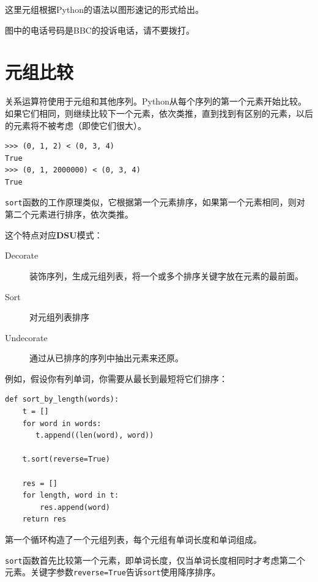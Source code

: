 这里元组根据Python的语法以图形速记的形式给出。

图中的电话号码是BBC的投诉电话，请不要拨打。



\section{元组比较}


关系运算符使用于元组和其他序列。Python从每个序列的第一个元素开始比较。如果它们相同，则继续比较下一个元素，依次类推，直到找到有区别的元素，以后的元素将不被考虑（即使它们很大）。

\beforeverb
\begin{verbatim}
>>> (0, 1, 2) < (0, 3, 4)
True
>>> (0, 1, 2000000) < (0, 3, 4)
True
\end{verbatim}
\afterverb
%
{\tt sort}函数的工作原理类似，它根据第一个元素排序，如果第一个元素相同，则对第二个元素进行排序，依次类推。

这个特点对应{\bf DSU}模式： 

\begin{description}

\item[Decorate] 装饰序列，生成元组列表，将一个或多个排序关键字放在元素的最前面。

\item[Sort] 对元组列表排序

\item[Undecorate] 通过从已排序的序列中抽出元素来还原。

\end{description}

\label{DSU}

例如，假设你有列单词，你需要从最长到最短将它们排序：

\beforeverb
\begin{verbatim}
def sort_by_length(words):
    t = []
    for word in words:
       t.append((len(word), word))

    t.sort(reverse=True)

    res = []
    for length, word in t:
        res.append(word)
    return res
\end{verbatim}
\afterverb
%
第一个循环构造了一个元组列表，每个元组有单词长度和单词组成。

{\tt sort}函数首先比较第一个元素，即单词长度，仅当单词长度相同时才考虑第二个元素。关键字参数{\tt reverse=True}告诉{\tt sort}使用降序排序。

